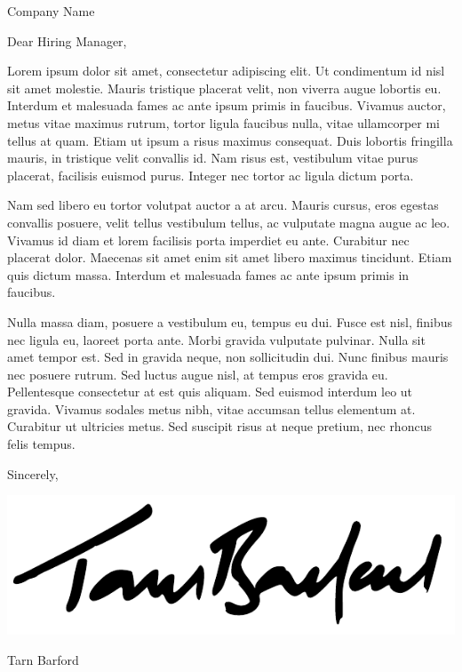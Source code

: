 \documentclass[12pt]{letter}
\begin{document}
  \begin{letter}{Company Name}

  \opening{Dear Hiring Manager,}

  Lorem ipsum dolor sit amet, consectetur adipiscing elit. Ut condimentum id
  nisl sit amet molestie. Mauris tristique placerat velit, non viverra augue
  lobortis eu. Interdum et malesuada fames ac ante ipsum primis in faucibus.
  Vivamus auctor, metus vitae maximus rutrum, tortor ligula faucibus nulla,
  vitae ullamcorper mi tellus at quam. Etiam ut ipsum a risus maximus
  consequat. Duis lobortis fringilla mauris, in tristique velit convallis id.
  Nam risus est, vestibulum vitae purus placerat, facilisis euismod purus.
  Integer nec tortor ac ligula dictum porta.

  Nam sed libero eu tortor volutpat auctor a at arcu. Mauris cursus, eros
  egestas convallis posuere, velit tellus vestibulum tellus, ac vulputate
  magna augue ac leo. Vivamus id diam et lorem facilisis porta imperdiet eu
  ante. Curabitur nec placerat dolor. Maecenas sit amet enim sit amet libero
  maximus tincidunt. Etiam quis dictum massa. Interdum et malesuada fames ac
  ante ipsum primis in faucibus.

  Nulla massa diam, posuere a vestibulum eu, tempus eu dui. Fusce est nisl,
  finibus nec ligula eu, laoreet porta ante. Morbi gravida vulputate
  pulvinar. Nulla sit amet tempor est. Sed in gravida neque, non sollicitudin
  dui. Nunc finibus mauris nec posuere rutrum. Sed luctus augue nisl, at
  tempus eros gravida eu. Pellentesque consectetur at est quis aliquam. Sed
  euismod interdum leo ut gravida. Vivamus sodales metus nibh, vitae accumsan
  tellus elementum at. Curabitur ut ultricies metus. Sed suscipit risus at
  neque pretium, nec rhoncus felis tempus.

    \vspace{0.5em}

    Sincerely,
    \par
    \hspace{-1em}
    \includegraphics[height=2.5\baselineskip]{signature}
    \vspace{-1em}
    \par
    Tarn Barford

  \end{letter}
\end{document}
